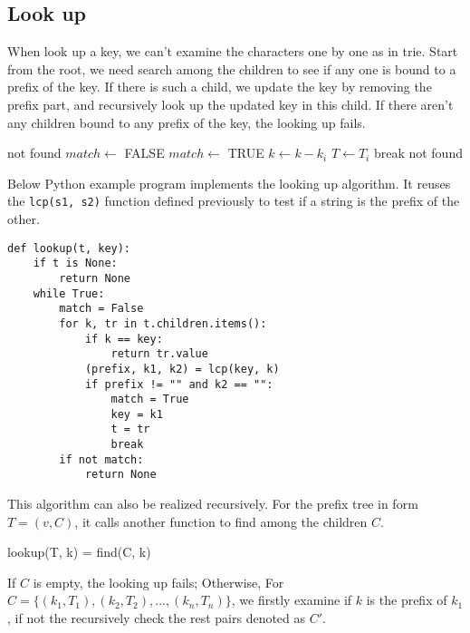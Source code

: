 \documentclass{article}
\begin{document}
\subsection{Look up}
When look up a key, we can't examine the characters one by one
as in trie. Start from the root, we need search among the children
to see if any one is bound to a prefix of the key.
If there is such a child, we update the key by removing the prefix
part, and recursively look up the updated key in this child.
If there aren't any children bound to any prefix of the key,
the looking up fails.

\begin{algorithmic}[1]
     \State \Return not found
   \EndIf
  \Repeat
    \State $match \gets$ FALSE
        \State \Return {}
      \EndIf
        \State $match \gets$ TRUE
        \State $k \gets k - k_i$
        \State $T \gets T_i$
        \State break
      \EndIf
    \EndFor
  \State \Return not found
\EndFunction
\end{algorithmic}

Below Python example program implements the looking up algorithm.
It reuses the \texttt{lcp(s1, s2)} function
defined previously to test if a string is the prefix of the other.

\lstset{language=Python}
\begin{lstlisting}
def lookup(t, key):
    if t is None:
        return None
    while True:
        match = False
        for k, tr in t.children.items():
            if k == key:
                return tr.value
            (prefix, k1, k2) = lcp(key, k)
            if prefix != "" and k2 == "":
                match = True
                key = k1
                t = tr
                break
        if not match:
            return None
\end{lstlisting}

This algorithm can also be realized recursively. For the prefix tree in form
$T = (v, C)$, it calls another function to find among the children $C$.

\be
lookup(T, k) = find(C, k)
\ee

If $C$ is empty, the looking up fails; Otherwise, For $C = \{(k_1, T_1), (k_2, T_2), ..., (k_n, T_n)\}$, we firstly examine if $k$ is the prefix of $k_1$, if not the
recursively check the rest pairs denoted as $C'$.
\end{document}
